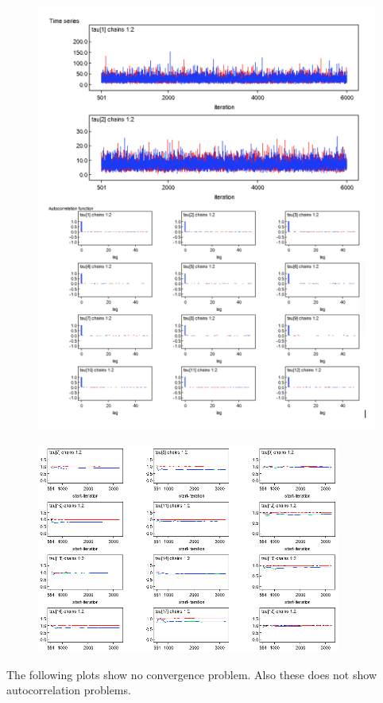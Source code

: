 \documentclass{article}
\begin{document}
\begin{figure}[ht!]
\centering
\includegraphics[width=12cm]{figures/model3_tau.png}
\end{figure}

\begin{figure}[ht!]
\centering
\includegraphics[width=10cm]{figures/model3_tau2.png}
\end{figure}


The following plots show no convergence problem. Also these does not show autocorrelation problems.
\end{document}
